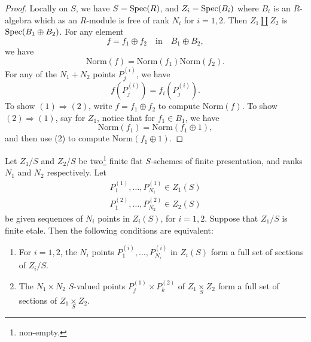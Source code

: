 \begin{proof}
Locally on $S$, we have $S = \operatorname{Spec}(R)$, and $Z_i = \operatorname{Spec}(B_i)$ where $B_i$ is an $R$-algebra which as an $R$-module is free of rank $N_i$ for $i = 1, 2$. Then $Z_1 \amalg Z_2$ is $\operatorname{Spec}(B_1 \oplus B_2)$. For any element
\[
f = f_1 \oplus f_2 \quad \text{in} \quad B_1 \oplus B_2,
\]
we have
\[
\mathrm{Norm}(f) = \mathrm{Norm}(f_1) \mathrm{Norm}(f_2).
\]
For any of the $N_1 + N_2$ points $P_j^{(i)}$, we have
\[
f(P_j^{(i)}) = f_i(P_j^{(i)}).
\]
To show $(1) \Longrightarrow (2)$, write $f = f_1 \oplus f_2$ to compute $\mathrm{Norm}(f)$. To show $(2) \Longrightarrow (1)$, say for $Z_1$, notice that for $f_1 \in B_1$, we have
\[
\mathrm{Norm}(f_1) = \mathrm{Norm}(f_1 \oplus 1),
\]
and then use (2) to compute $\mathrm{Norm}(f_1 \oplus 1)$.
\end{proof}

\begin{lemma}\label{lem:1.8.5}
Let $Z_1/S$ and $Z_2/S$ be two\footnote{non-empty.} finite flat $S$-schemes of finite presentation, and ranks $N_1$ and $N_2$ respectively. Let
\begin{gather*}
P_1^{(1)}, \dots, P_{N_1}^{(1)} \in Z_1(S) \\
P_1^{(2)}, \dots, P_{N_2}^{(2)} \in Z_2(S)
\end{gather*}
be given sequences of $N_i$ points in $Z_i(S)$, for $i = 1, 2$. Suppose that $Z_1/S$ is finite etale. Then the following conditions are equivalent:
\begin{enumerate}[(1)]
\item For $i = 1, 2$, the $N_i$ points $P_1^{(i)}, \dots, P_{N_i}^{(i)}$ in $Z_i(S)$ form a full set of sections of $Z_i/S$.
\item The $N_1 \times N_2$ $S$-valued points $P_j^{(1)} \times P_k^{(2)}$ of $Z_1 \underset{S}{\times} Z_2$ form a full set of sections of $Z_1 \underset{S}{\times} Z_2$.
\end{enumerate}
\end{lemma}

